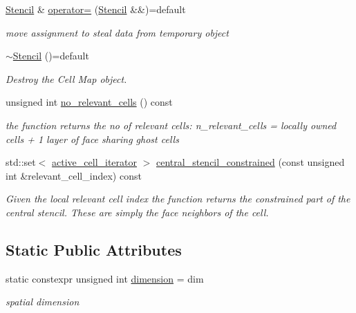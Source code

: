 \begin{DoxyCompactItemize}
\hyperlink{classweno_1_1_stencil}{Stencil} \& \hyperlink{classweno_1_1_stencil_aa336788a2665ff4dde40bf0dd853a9aa}{operator=} (\hyperlink{classweno_1_1_stencil}{Stencil} \&\&)=default
\begin{DoxyCompactList}\small\item\em move assignment to steal data from temporary object \end{DoxyCompactList}\item 
\hyperlink{classweno_1_1_stencil_adadca4d1773a270be6a84a0e9b7c7b0c}{$\sim$\+Stencil} ()=default
\begin{DoxyCompactList}\small\item\em Destroy the Cell Map object. \end{DoxyCompactList}\item 
unsigned int \hyperlink{classweno_1_1_stencil_a094f79cdf961bfcab7ff7af5d5faf204}{no\+\_\+relevant\+\_\+cells} () const
\begin{DoxyCompactList}\small\item\em the function returns the no of relevant cells\+: n\+\_\+relevant\+\_\+cells = locally owned cells + 1 layer of face sharing ghost cells \end{DoxyCompactList}\item 
std\+::set$<$ \hyperlink{classweno_1_1_stencil_a5a730ad61bd5e9c36a86ccb36578f42c}{active\+\_\+cell\+\_\+iterator} $>$ \hyperlink{classweno_1_1_stencil_ace32c426133dae0d0fcb0d35f687c0ef}{central\+\_\+stencil\+\_\+constrained} (const unsigned int \&relevant\+\_\+cell\+\_\+index) const
\begin{DoxyCompactList}\small\item\em Given the local relevant cell index the function returns the constrained part of the central stencil. These are simply the face neighbors of the cell. \end{DoxyCompactList}\end{DoxyCompactItemize}
\subsection*{Static Public Attributes}
\begin{DoxyCompactItemize}
\item 
static constexpr unsigned int \hyperlink{classweno_1_1_stencil_a975242f28442f0358abc294910eb1d7b}{dimension} = dim
\begin{DoxyCompactList}\small\item\em spatial dimension \end{DoxyCompactList}\end{DoxyCompactItemize}


